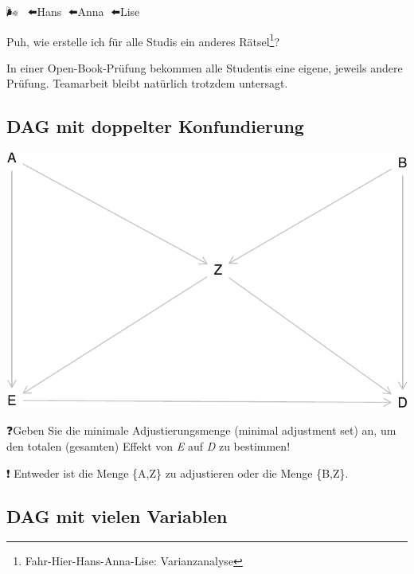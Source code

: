 \documentclass[
  a4paper,
  DIV=11]{scrreprt}
\theoremstyle{definition}
\theoremstyle{remark}
\begin{document}
🌬🚙🙋️👨⬅️Hans 👧⬅️Anna 👩⬅️Lise

Puh, wie erstelle ich für alle Studis ein anderes Rätsel\footnote{Fahr-Hier-Hans-Anna-Lise:
  Varianzanalyse}?

\begin{tcolorbox}[enhanced jigsaw, colframe=quarto-callout-note-color-frame, title=\textcolor{quarto-callout-note-color}{\faInfo}\hspace{0.5em}{Hinweis}, breakable, leftrule=.75mm, coltitle=black, toptitle=1mm, bottomrule=.15mm, bottomtitle=1mm, opacityback=0, arc=.35mm, rightrule=.15mm, left=2mm, colbacktitle=quarto-callout-note-color!10!white, opacitybacktitle=0.6, toprule=.15mm, titlerule=0mm, colback=white]
In einer Open-Book-Prüfung bekommen alle Studentis eine eigene, jeweils
andere Prüfung. Teamarbeit bleibt natürlich trotzdem untersagt.
\end{tcolorbox}

\hypertarget{dag-mit-doppelter-konfundierung}{%
\subsection{DAG mit doppelter
Konfundierung}\label{dag-mit-doppelter-konfundierung}}

\includegraphics{./abschluss_files/figure-pdf/dag2-1.pdf}

❓Geben Sie die minimale Adjustierungsmenge (minimal adjustment set) an,
um den totalen (gesamten) Effekt von \emph{E} auf \emph{D} zu bestimmen!

❗ Entweder ist die Menge \{A,Z\} zu adjustieren oder die Menge \{B,Z\}.

\hypertarget{dag-mit-vielen-variablen}{%
\subsection{DAG mit vielen Variablen}\label{dag-mit-vielen-variablen}}
\end{document}
